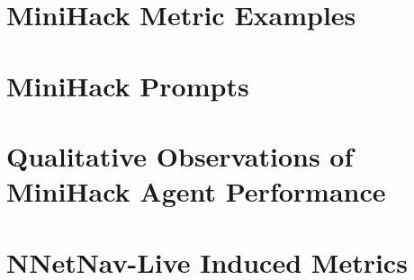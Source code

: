 \documentclass[../main.tex]{subfiles}
\begin{document}
    \section{MiniHack Metric Examples}
    \label{appendix:minihack_metrics}
    
    \newpage

    \section{MiniHack Prompts}
    \label{appendix:minihack_prompts}
    
    \newpage

    \section{Qualitative Observations of MiniHack Agent Performance}
    \label{appendix:minihack_obs}
    

    \section{NNetNav-Live Induced Metrics}
    \label{appendix:nnetnav_live}
    
\end{document}
